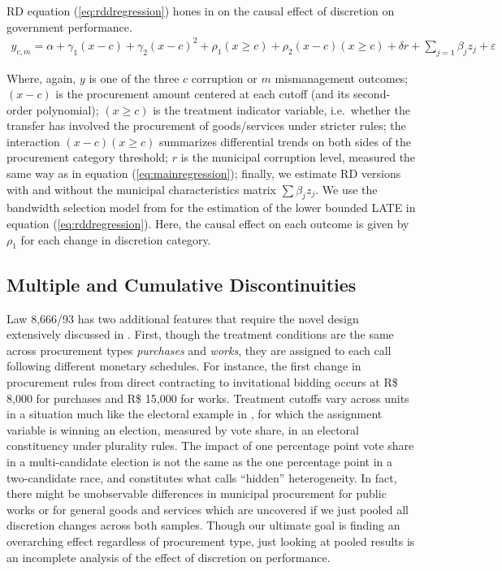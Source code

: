\documentclass[11pt]{article}
\begin{document}
RD equation (\ref{eq:rddregression}) hones in on the causal effect of discretion on government performance.
\begin{equation} \label{eq:rddregression}
  \begin{aligned}
    y_{c,m} = \alpha + \gamma_{1}(x-c) + \gamma_{2}(x-c)^{2}+ \rho_{1}(x \geq c) + \rho_{2} (x-c) (x \geq c) + \delta r + \sum_{j = 1} \beta_{j} z_{j} + \varepsilon
  \end{aligned}
\end{equation}

Where, again, $y$ is one of the three $c$ corruption or $m$ mismanagement outcomes; $(x - c)$ is the procurement amount centered at each cutoff (and its second-order polynomial); $(x \geq c)$ is the treatment indicator variable, i.e.~whether the transfer has involved the procurement of goods/services under stricter rules; the interaction $(x - c)(x \geq c)$ summarizes differential trends on both sides of the procurement category threshold; $r$ is the municipal corruption level, measured the same way as in equation (\ref{eq:mainregression}); finally, we estimate RD versions with and without the municipal characteristics matrix $\sum \beta_{j} z_{j}$. We use the bandwidth selection model from \citet{CalonicoOptimalDataDrivenRegression2015} for the estimation of the lower bounded LATE in equation (\ref{eq:rddregression}). Here, the causal effect on each outcome is given by $\rho_{1}$ for each change in discretion category.

\subsection{Multiple and Cumulative Discontinuities} \label{subsec:multiplecutoff}

Law 8,666/93 has two additional features that require the novel design extensively discussed in \citet{CattaneoInterpretingRegressionDiscontinuity2016}. First, though the treatment conditions are the same across procurement types \emph{purchases} and \emph{works}, they are assigned to each call following different monetary schedules. For instance, the first change in procurement rules from direct contracting to invitational bidding occurs at R\$ 8,000 for purchases and R\$ 15,000 for works. Treatment cutoffs vary across units in a situation much like the electoral example in \citet{CattaneoInterpretingRegressionDiscontinuity2016}, for which the assignment variable is winning an election, measured by vote share, in an electoral constituency under plurality rules. The impact of one percentage point vote share in a multi-candidate election is not the same as the one percentage point in a two-candidate race, and constitutes what \citet{CattaneoInterpretingRegressionDiscontinuity2016} calls ``hidden'' heterogeneity. In fact, there might be unobservable differences in municipal procurement for public works or for general goods and services which are uncovered if we just pooled all discretion changes across both samples. Though our ultimate goal is finding an overarching effect regardless of procurement type, just looking at pooled results is an incomplete analysis of the effect of discretion on performance.
\end{document}
